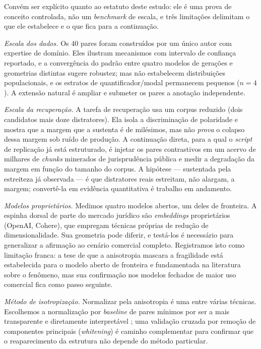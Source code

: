 \documentclass[11pt]{article}
\begin{document}
Convém ser explícito quanto ao estatuto deste estudo: ele é uma prova de conceito
controlada, não um \textit{benchmark} de escala, e três limitações delimitam o que
ele estabelece e o que fica para a continuação.

\textit{Escala dos dados.} Os 40 pares foram construídos por um único autor com
expertise de domínio. Eles ilustram mecanismos com intervalo de confiança
reportado, e a convergência do padrão entre quatro modelos de gerações e
geometrias distintas sugere robustez; mas não estabelecem distribuições
populacionais, e os estratos de quantificador/modal permanecem pequenos ($n=4$).
A extensão natural é ampliar e submeter os pares a anotação independente.

\textit{Escala da recuperação.} A tarefa de recuperação usa um corpus reduzido
(dois candidatos mais doze distratores). Ela isola a discriminação de polaridade e
mostra que a margem que a sustenta é de milésimos, mas não \emph{prova} o colapso
dessa margem sob ruído de produção. A continuação direta, para a qual o
\textit{script} de replicação já está estruturado, é injetar os pares contrastivos
em um acervo de milhares de \textit{chunks} minerados de jurisprudência pública e
medir a degradação da margem em função do tamanho do corpus. A hipótese ---
sustentada pela estreiteza já observada --- é que distratores reais estreitam, não
alargam, a margem; convertê-la em evidência quantitativa é trabalho em andamento.

\textit{Modelos proprietários.} Medimos quatro modelos abertos, um deles de
fronteira. A espinha dorsal de parte do mercado jurídico são \textit{embeddings}
proprietários (OpenAI, Cohere), que empregam técnicas próprias de redução de
dimensionalidade. Sua geometria pode diferir, e testá-los é necessário para
generalizar a afirmação ao cenário comercial completo. Registramos isto como
limitação franca: a tese de que a anisotropia mascara a fragilidade está
estabelecida para o modelo aberto de fronteira e fundamentada na literatura sobre
o fenômeno, mas sua confirmação nos modelos fechados de maior uso comercial fica
como passo seguinte.

\textit{Método de isotropização.} Normalizar pela anisotropia é uma entre várias
técnicas. Escolhemos a normalização por \textit{baseline} de pares mínimos por ser
a mais transparente e diretamente interpretável \cite{heros2023}; uma validação
cruzada por remoção de componentes principais (\textit{whitening}) é caminho
complementar para confirmar que o reaparecimento da estrutura não depende do
método particular.
\end{document}
